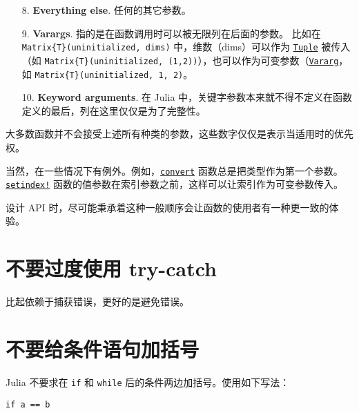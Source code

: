 \begin{itemize}
\item[8.  ] \textbf{Everything else}. 任何的其它参数。


\item[9.  ] \textbf{Varargs}. 指的是在函数调用时可以被无限列在后面的参数。 比如在 \texttt{Matrix\{T\}(uninitialized, dims)} 中，维数（dims）可以作为 \hyperlink{17462354060312563026}{\texttt{Tuple}} 被传入（如 \texttt{Matrix\{T\}(uninitialized, (1,2))}），也可以作为可变参数（\hyperlink{5941806424098279588}{\texttt{Vararg}}，如 \texttt{Matrix\{T\}(uninitialized, 1, 2)}。


\item[10. ] \textbf{Keyword arguments}. 在 Julia 中，关键字参数本来就不得不定义在函数定义的最后，列在这里仅仅是为了完整性。

\end{itemize}


大多数函数并不会接受上述所有种类的参数，这些数字仅仅是表示当适用时的优先权。



当然，在一些情况下有例外。例如，\hyperlink{1846942650946171605}{\texttt{convert}} 函数总是把类型作为第一个参数。\hyperlink{1309244355901386657}{\texttt{setindex!}} 函数的值参数在索引参数之前，这样可以让索引作为可变参数传入。



设计 API 时，尽可能秉承着这种一般顺序会让函数的使用者有一种更一致的体验。



\hypertarget{16340212137156679332}{}


\section{不要过度使用 try-catch}



比起依赖于捕获错误，更好的是避免错误。



\hypertarget{15308468417216899816}{}


\section{不要给条件语句加括号}



Julia 不要求在 \texttt{if} 和 \texttt{while} 后的条件两边加括号。使用如下写法：




\begin{verbatim}
if a == b
\end{verbatim}



